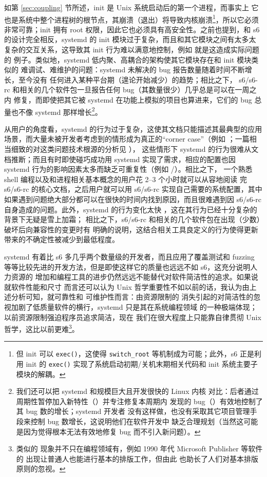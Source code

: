 如第 \ref{sec:coupling} 节所述，init 是 Unix 系统启动后的第一个进程，而事实上
它也是系统中整个进程树的根节点，其崩溃（退出）将导致内核崩溃\footnote{但 init
可以 \texttt{exec()}，这使得 \texttt{switch\_root} 等机制成为可能；此外，s6
正是利用 init 的 \texttt{exec()} 实现了系统启动初期/关机末期相关代码和 init
系统主要子模块的解耦。}，所以它必须非常可靠；init 拥有 root
权限，因此它也必须具有高安全性。之前也提到，和 s6 的设计完全相反，systemd 的
init 模块过于复杂，而且和其它模块之间有太多太复杂的交互关系，这导致其 init
行为难以满意地控制，例如 \parencite{ayer2016, edge2017} 就是这造成实际问题的
例子。类似地，systemd 低内聚、高耦合的架构使其它模块存在和 init 模块类似的
难调试、难维护的问题：systemd 未解决的 bug 报告数量随着时间不断增长，至今没有
任何进入某种平台期（遑论开始减少）的趋势；相比之下，%
s6/s6-rc 和相关的几个软件包一旦报告任何 bug（其数量很少）几乎总是可以在一周之内
修复，而即使把其它被 systemd 在功能上模拟的项目也算进来，它们的 bug 总量也不像
systemd 那样增长\footnote{我们还可以把 systemd 和规模巨大且开发很快的 Linux 内核
对比：后者通过周期性暂停加入新特性（）并专注修复本周期内
发现的 bug（）有效地控制了其 bug 数的增长；systemd 开发者
没有这样做，也没有采取其它项目管理手段来控制 bug 数增长，这说明他们在软件开发中
缺乏合理规划（当然这可能是因为觉得根本无法有效地修复 bug 而不引入新问题）。}。

从用户的角度看，systemd 的行为过于复杂，这使其文档只能描述其最典型的应用
场景，而大量未被开发者考虑到的情形成为真正的“corner case”（例如 \parencite%
{dbiii2016}；一篇相当细致的对这类问题技术根源的分析见 \parencite{vr2015}），
这些情形下 systemd 的行为很难从文档推断；而且有时即使碰巧成功用 systemd
实现了需求，相应的配置也因 systemd 行为的影响因素太多而缺乏可重复性（例如
\parencite{fitzcarraldo2018}/\parencite{magsforumtechno.2019}）。相比之下，
一个熟悉 shell 编程以及和进程相关基本概念的用户花 2--3 个小时就可以从容地阅读
完 s6/s6-rc 的核心文档，之后用户就可以用 s6/s6-rc 实现自己需要的系统配置，其中
如果遇到问题绝大部分都可以在很快的时间内找到原因，而且很难遇到因 s6/s6-rc
自身造成的问题。此外，systemd 的行为变化太快%
，这在其行为已经十分复杂的背景下无疑是雪上加霜；
相比之下，s6/s6-rc 和相关的几个软件包在出现（少数）破坏后向兼容性的变更时有
明确的说明，这结合相关工具良定义的行为使得更新带来的不确定性被减少到最低程度。

systemd 有着比 s6 多几乎两个数量级的开发者，而且应用了覆盖测试和 fuzzing
等等比较先进的开发方法，但是即使这样它的质量也远远不如 s6，这充分说明人力资源的
增加和编程工具的进步仍然远远不能替代对软件简洁性的追求。如果说就软件性能和尺寸
而言还可以认为 Unix 哲学重要性不如以前的话，我认为由上述分析可知，就可靠性和
可维护性而言：由资源限制的
消失引起的对简洁性的忽视加剧了低质量软件的横行，systemd 只是其在系统编程领域
的一种极端体现；以前资源限制强迫程序员追求简洁，现在
我们在很大程度上只能靠自律贯彻 Unix 哲学，这比以前更难\footnote{类似的
现象并不只在编程领域有，例如 1990 年代 Microsoft Publisher 等软件的
出现让普通人也能进行基本的排版工作，但由此
也助长了人们对基本排版原则的忽视。}。

